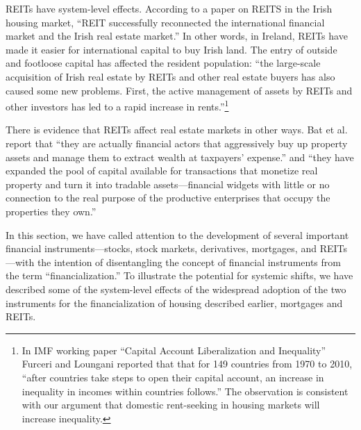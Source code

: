 REITs have system-level effects. %
According to a paper \cite{wangAnalyzeImpactREITs2021} on REITS in the Irish housing market, ``REIT successfully reconnected the international financial market and the Irish real estate market.'' In other words, in Ireland, REITs have made it easier for international capital to buy Irish land. The entry of outside and footloose capital has affected the resident population:  ``the large-scale acquisition of Irish real estate by REITs and other real estate buyers has also caused some new problems. First, the active management of assets by REITs and other investors has led to a rapid increase in rents.''\footnote{In  IMF working paper ``Capital Account Liberalization and Inequality'' \cite{furceriCapitalAccountLiberalization2015}  Furceri and Loungani reported that that for 149 countries from 1970 to 2010, ``after countries take steps to open their capital account, an increase in inequality in incomes within countries follows.'' The observation is consistent with our argument that domestic \gls{rent-seeking} in housing markets will increase inequality.}  

There is evidence that REITs affect real estate markets in other ways. Bat et al.  \cite{batRolePublicREITs2022} report that  ``they are actually financial actors that aggressively buy up property assets and manage them to extract wealth at taxpayers' expense.'' and ``they have expanded the pool of capital available for transactions that monetize real property and turn it into tradable assets---financial widgets with little or no connection to the real purpose of the productive enterprises that occupy the properties they own.''

In this section, we have called attention to the development of several important financial instruments---stocks, stock markets, derivatives, mortgages, and REITs---with the intention of disentangling the concept of financial instruments from the term ``financialization.'' %
To illustrate the potential for systemic shifts, we have described some of the system-level effects of the widespread adoption of the two instruments for the financialization of housing described earlier, mortgages and REITs. %

